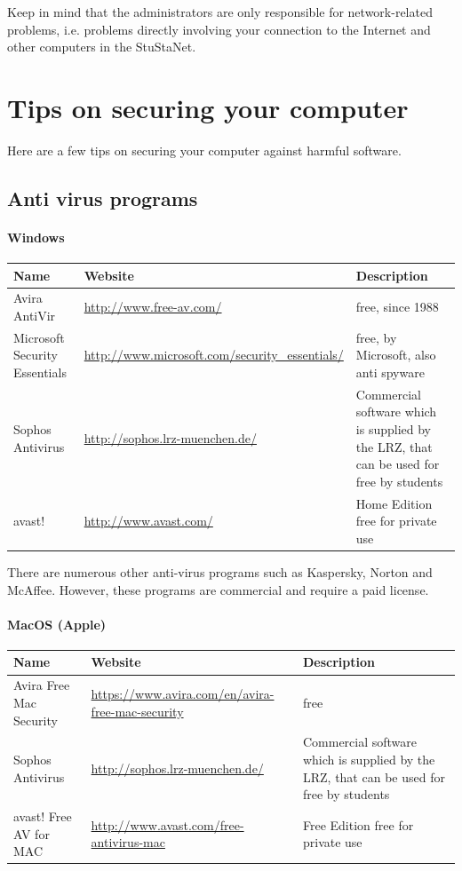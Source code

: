 \documentclass[a4paper,12pt]{scrartcl}
\begin{document}
Keep in mind that the administrators are only responsible for network-related problems, i.e. problems directly involving your connection to the Internet and other computers in the StuStaNet.

\newpage
\section*{Tips on securing your computer}

Here are a few tips on securing your computer against harmful software.

\subsection*{Anti virus programs}
\paragraph*{Windows}
\begin{center}
  \begin{tabularx}{\linewidth}{|p{.2\linewidth}XX|}
    \hline
    Name & Website & Description\\
    \hline \hline
    Avira AntiVir & \url{http://www.free-av.com/} & free, since 1988\\
    \hline
    Microsoft Security Essentials & \url{http://www.microsoft.com/security\_essentials/} & free, by Microsoft, also anti spyware\\
    \hline
    Sophos Antivirus & \url{http://sophos.lrz-muenchen.de/} & Commercial software which is supplied by the LRZ, that can be used for free by students\\
    \hline
    avast! & \url{http://www.avast.com/} & Home Edition free for private use\\
    \hline
  \end{tabularx}
\end{center}

There are numerous other anti-virus programs such as Kaspersky, Norton and McAffee. However, these programs are commercial and require a paid license.

\paragraph*{MacOS (Apple)}
\begin{center}
  \begin{tabularx}{\linewidth}{|p{.2\linewidth}XX|}
    \hline
    Name & Website & Description\\
    \hline \hline
    Avira Free Mac Security & \url{https://www.avira.com/en/avira-free-mac-security} & free\\
    \hline
    Sophos Antivirus & \url{http://sophos.lrz-muenchen.de/} & Commercial software which is supplied by the LRZ, that can be used for free by students\\
    \hline
    avast! Free AV for MAC & \url{http://www.avast.com/free-antivirus-mac} & Free Edition free for private use\\
    \hline
  \end{tabularx}
\end{center}
\end{document}
